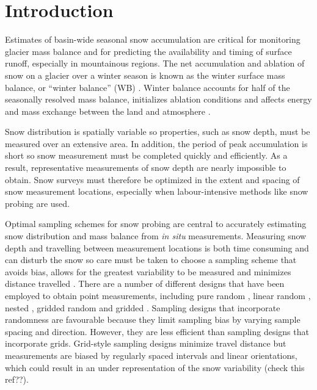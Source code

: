 \documentclass[twocolumn,letterpaper]{igs}
\begin{document}
\maketitle

\section{Introduction}

Estimates of basin-wide seasonal snow accumulation are critical for monitoring glacier mass balance and for predicting the availability and timing of surface runoff, especially in mountainous regions. The net accumulation and ablation of snow on a glacier over a winter season is known as the winter surface mass balance, or ``winter balance'' (WB) \citep{Cogley2011}. Winter balance accounts for half of the seasonally resolved mass balance, initializes ablation conditions and affects energy and mass exchange between the land and atmosphere \citep[e.g.][]{Hock2005, Reveillet2016}. 

Snow distribution is spatially variable so properties, such as snow depth, must be measured over an extensive area. In addition, the period of peak accumulation is short so snow measurement must be completed quickly and efficiently. As a result, representative measurements of snow depth are nearly impossible to obtain. Snow surveys must therefore be optimized in the extent and spacing of snow measurement locations, especially when labour-intensive methods like snow probing are used. 

Optimal sampling schemes for snow probing are central to accurately estimating snow distribution and mass balance from \textit{in situ} measurements. Measuring snow depth and travelling between measurement locations is both time consuming and can disturb the snow so care must be taken to choose a sampling scheme that avoids bias, allows for the greatest variability to be measured and minimizes distance travelled \citep{Shea2010}. There are a number of different designs that have been employed to obtain point measurements, including pure random \citep[e.g.][]{Elder1991}, linear random \cite[e.g.][]{Shea2010}, nested \citep[e.g.][]{Schweizer2008}, gridded random \citep[e.g.][]{Bellaire2008, Elder2009, Bellaire2011} and gridded \citep[e.g.][]{Molotch2005a, Kronholm2004, Lopez2011}. Sampling designs that incorporate randomness are favourable because they limit sampling bias by varying sample spacing and direction. However, they are less efficient than sampling designs that incorporate grids. Grid-style sampling designs minimize travel distance but measurements are biased by regularly spaced intervals and linear orientations, which could result in an under representation of the snow variability \citep{Kronholm2004} (check this ref??).
\end{document}

